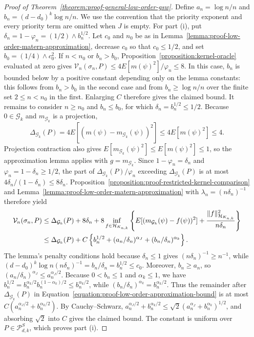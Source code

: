 \documentclass[letterpaper,12pt]{article}
\theoremstyle{definition}
\numberwithin{equation}{section}
\newcommand{\mc}{\mathcal}
\newcommand{\norm}[1]{\lVert#1\rVert}
\begin{document}
\begin{proof}[Proof of Theorem~\ref{theorem:proof-general-low-order-gsw}]
Define $a_n=\log n/n$ and $b_n=(d-d_0)^k\log n/n$.
We use the convention that the priority exponent and every priority term are omitted when $J$ is empty.
For part (i), put $\delta_n=1-\varphi_n=(1/2)\wedge b_n^{1/2}$.
Let $c_0$ and $n_0$ be as in Lemma~\ref{lemma:proof-low-order-matern-approximation}, decrease $c_0$ so that $c_0\leq1/2$, and set $b_0=(1/4)\wedge c_0^2$.
If $n<n_0$ or $b_n>b_0$, Proposition~\ref{proposition:kernel-oracle} evaluated at zero gives $\mc V_n(\sigma_n,P)\leq4E[m(\psi)^2]/\varphi_n\leq8$.
In this case, $b_n$ is bounded below by a positive constant depending only on the lemma constants: this follows from $b_n>b_0$ in the second case and from $b_n\geq\log n/n$ over the finite set $2\leq n<n_0$ in the first.
Enlarging $C$ therefore gives the claimed bound.
It remains to consider $n\geq n_0$ and $b_n\leq b_0$, for which $\delta_n=b_n^{1/2}\leq1/2$.
Because $0\in\mc G_k$ and $m_{\mc G_k}$ is a projection,
\begin{equation}
\Delta_{\mc G_k}(P)=4E[(m(\psi)-m_{\mc G_k}(\psi))^2]\leq4E[m(\psi)^2]\leq4.
\end{equation}
Projection contraction also gives $E[m_{\mc G_k}(\psi)^2]\leq E[m(\psi)^2]\leq1$, so the approximation lemma applies with $g=m_{\mc G_k}$.
Since $1-\varphi_n=\delta_n$ and $\varphi_n=1-\delta_n\geq1/2$, the part of $\Delta_{\mc G_k}(P)/\varphi_n$ exceeding $\Delta_{\mc G_k}(P)$ is at most $4\delta_n/(1-\delta_n)\leq8\delta_n$.
Proposition~\ref{proposition:proof-restricted-kernel-comparison} and Lemma~\ref{lemma:proof-low-order-matern-approximation} with $\lambda_n=(n\delta_n)^{-1}$ therefore yield
\begin{align}
\mc V_n(\sigma_n,P)&\leq\Delta_{\mc G_k}(P)+8\delta_n+8\inf_{f\in\mc H_{K_{n,k}}}\left\{E[(m_{\mc G_k}(\psi)-f(\psi))^2]+\frac{\norm{f}_{\mc H_{K_{n,k}}}^2}{n\delta_n}\right\}\notag\\
&\leq\Delta_{\mc G_k}(P)+C\left\{b_n^{1/2}+(a_n/\delta_n)^{\alpha_J}+(b_n/\delta_n)^{\alpha_k}\right\}.\label{equation:proof-low-order-approximation-bound}
\end{align}
The lemma's penalty conditions hold because $\delta_n\leq1$ gives $(n\delta_n)^{-1}\geq n^{-1}$, while $(d-d_0)^k\log n(n\delta_n)^{-1}=b_n/\delta_n=b_n^{1/2}\leq c_0$.
Moreover, $b_n\geq a_n$, so $(a_n/\delta_n)^{\alpha_J}\leq a_n^{\alpha_J/2}$.
Because $0<b_n\leq1$ and $\alpha_k\leq1$, we have $b_n^{1/2}=b_n^{\alpha_k/2}b_n^{(1-\alpha_k)/2}\leq b_n^{\alpha_k/2}$, while $(b_n/\delta_n)^{\alpha_k}=b_n^{\alpha_k/2}$.
Thus the remainder after $\Delta_{\mc G_k}(P)$ in Equation~\eqref{equation:proof-low-order-approximation-bound} is at most $C(a_n^{\alpha_J/2}+b_n^{\alpha_k/2})$.
By Cauchy--Schwarz, $a_n^{\alpha_J/2}+b_n^{\alpha_k/2}\leq\sqrt{2}(a_n^{\alpha_J}+b_n^{\alpha_k})^{1/2}$, and absorbing $\sqrt{2}$ into $C$ gives the claimed bound.
The constant is uniform over $P\in\mc P_{d,k}^{S}$, which proves part (i).


\end{proof}
\end{document}
